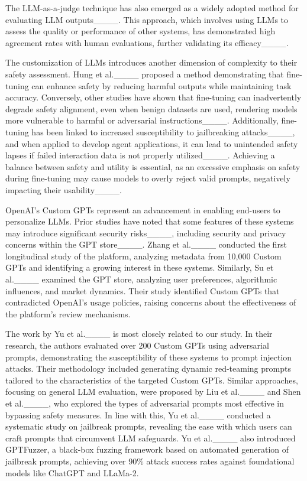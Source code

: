 The LLM-as-a-judge technique has also emerged as a widely adopted method for evaluating LLM outputs____. This approach, which involves using LLMs to assess the quality or performance of other systems, has demonstrated high agreement rates with human evaluations, further validating its efficacy____.

The customization of LLMs introduces another dimension of complexity to their safety assessment. Hung et al.____ proposed a method demonstrating that fine-tuning can enhance safety by reducing harmful outputs while maintaining task accuracy. Conversely, other studies have shown that fine-tuning can inadvertently degrade safety alignment, even when benign datasets are used, rendering models more vulnerable to harmful or adversarial instructions____. Additionally, fine-tuning has been linked to increased susceptibility to jailbreaking attacks____, and when applied to develop agent applications, it can lead to unintended safety lapses if failed interaction data is not properly utilized____. Achieving a balance between safety and utility is essential, as an excessive emphasis on safety during fine-tuning may cause models to overly reject valid prompts, negatively impacting their usability____.

OpenAI’s Custom GPTs represent an advancement in enabling end-users to personalize LLMs. Prior studies have noted that some features of these systems may introduce significant security risks____, including security and privacy concerns within the GPT store____. Zhang et al.____ conducted the first longitudinal study of the platform, analyzing metadata from 10,000 Custom GPTs and identifying a growing interest in these systems. Similarly, Su et al.____ examined the GPT store, analyzing user preferences, algorithmic influences, and market dynamics. Their study identified Custom GPTs that contradicted OpenAI’s usage policies, raising concerns about the effectiveness of the platform’s review mechanisms.

The work by Yu et al.____ is most closely related to our study. In their research, the authors evaluated over 200 Custom GPTs using adversarial prompts, demonstrating the susceptibility of these systems to prompt injection attacks. Their methodology included generating dynamic red-teaming prompts tailored to the characteristics of the targeted Custom GPTs. Similar approaches, focusing on general LLM evaluation, were proposed by Liu et al.____ and Shen et al.____, who explored the types of adversarial prompts most effective in bypassing safety measures. In line with this, Yu et al.____ conducted a systematic study on jailbreak prompts, revealing the ease with which users can craft prompts that circumvent LLM safeguards. Yu et al.____ also introduced GPTFuzzer, a black-box fuzzing framework based on automated generation of jailbreak prompts, achieving over 90\% attack success rates against foundational models like ChatGPT and LLaMa-2.

